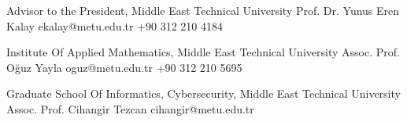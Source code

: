 

\begin{cventries}

  \cvrefentry
    {Advisor to the President, Middle East Technical University} %
    {Prof. Dr. Yunus Eren Kalay} %
    {ekalay@metu.edu.tr} %
    {+90 312 210 4184} %
    
  \cvrefentry
    {Institute Of Applied Mathematics, Middle East Technical University} %
    {Assoc. Prof. Oğuz Yayla} %
    {oguz@metu.edu.tr} %
    {+90 312 210 5695} %
    
  \cvrefentry
    {Graduate School Of Informatics, Cybersecurity, Middle East Technical University} %
    {Assoc. Prof. Cihangir Tezcan} %
    {cihangir@metu.edu.tr} %
    {}
\end{cventries}
